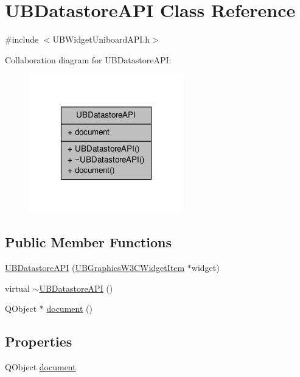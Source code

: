 \hypertarget{class_u_b_datastore_a_p_i}{\section{U\-B\-Datastore\-A\-P\-I Class Reference}
\label{df/d36/class_u_b_datastore_a_p_i}
}


{\ttfamily \#include $<$U\-B\-Widget\-Uniboard\-A\-P\-I.\-h$>$}



Collaboration diagram for U\-B\-Datastore\-A\-P\-I\-:
\nopagebreak
\begin{figure}[H]
\begin{center}
\leavevmode
\includegraphics[width=190pt]{db/d2a/class_u_b_datastore_a_p_i__coll__graph}
\end{center}
\end{figure}
\subsection*{Public Member Functions}
\begin{DoxyCompactItemize}
\item 
\hyperlink{class_u_b_datastore_a_p_i_a38f5262cbb1dc60d8338e7927a2250c8}{U\-B\-Datastore\-A\-P\-I} (\hyperlink{class_u_b_graphics_w3_c_widget_item}{U\-B\-Graphics\-W3\-C\-Widget\-Item} $\ast$widget)
\item 
virtual \hyperlink{class_u_b_datastore_a_p_i_a398d6692ab9d4849e526cb785a24bafa}{$\sim$\-U\-B\-Datastore\-A\-P\-I} ()
\item 
Q\-Object $\ast$ \hyperlink{class_u_b_datastore_a_p_i_ab0faf5ac0828ac1e3b4101f78e8f3841}{document} ()
\end{DoxyCompactItemize}
\subsection*{Properties}
\begin{DoxyCompactItemize}
\item 
Q\-Object \hyperlink{class_u_b_datastore_a_p_i_aa97dc90865baf7d162346cb9bca8ecf6}{document}
\end{DoxyCompactItemize}


